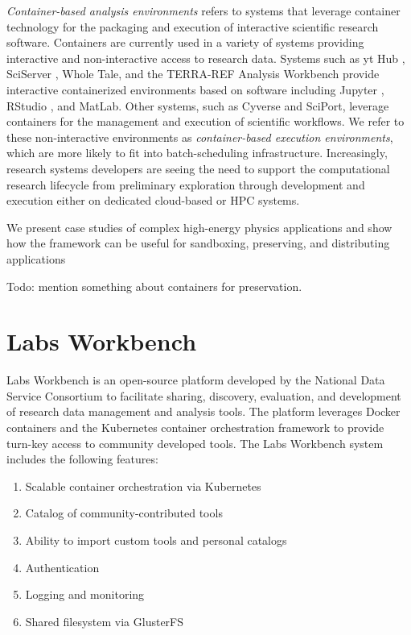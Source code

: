 \documentclass{sig-alternate}
\begin{document}
\emph{Container-based analysis environments} refers to systems that leverage container technology for the packaging and execution of interactive scientific research software. Containers are currently used in a variety of systems providing interactive and non-interactive access to research data. Systems such as yt Hub \cite{smith2011}, SciServer \cite{Medvedev:2016:SCB:2949689.2949700}, Whole Tale, and the TERRA-REF Analysis Workbench \cite{willis_craig_2017_580057} provide interactive containerized environments based on software including Jupyter \cite{kluyver2016jupyter}, RStudio \cite{Rstudio2015}, and MatLab. Other systems, such as Cyverse and SciPort\cite{Gerlach:2014:SCE:2689676.2689680}, leverage containers for the management and execution of scientific workflows. We refer to these non-interactive environments as \emph{container-based execution environments}, which are more likely to fit into batch-scheduling infrastructure.  Increasingly, research systems developers are seeing the need to support the computational research lifecycle from preliminary exploration through development and execution either on dedicated cloud-based or HPC systems.


We present case studies of complex high-energy physics applications and show how the framework can be useful for sandboxing, preserving, and distributing applications

Todo: mention something about containers for preservation.

\section{Labs Workbench}

Labs Workbench is an open-source platform developed by the National Data Service Consortium to facilitate sharing, discovery, evaluation, and development of research data management and analysis tools. The platform leverages Docker containers and the Kubernetes container orchestration framework to provide turn-key access to community developed tools. 
The Labs Workbench system includes the following features:
\begin{enumerate}
\itemsep-0.2em
\item Scalable container orchestration via Kubernetes
\item Catalog of community-contributed tools
\item Ability to import custom tools and personal catalogs
\item Authentication
\item Logging and monitoring
\item Shared filesystem via GlusterFS
\end{enumerate}
\end{document}

